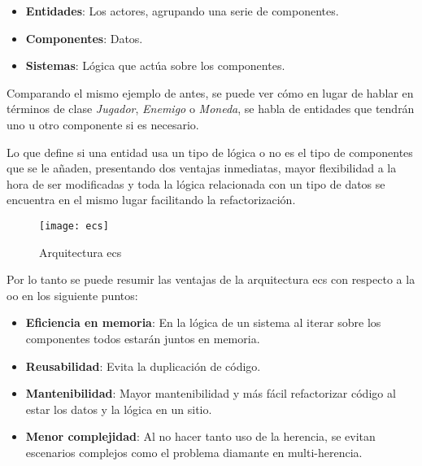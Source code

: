 \begin{itemize} 
	\item \textbf{Entidades}: Los actores, agrupando una serie de componentes. 
	\item \textbf{Componentes}: Datos.
	\item \textbf{Sistemas}: Lógica que actúa sobre los componentes.
\end{itemize}
Comparando el mismo ejemplo de antes, se puede ver cómo en lugar de hablar en términos de clase \textit{Jugador}, 
\textit{Enemigo} o \textit{Moneda}, se habla de entidades que tendrán uno u otro componente si es necesario.

Lo que define si una entidad usa un tipo de lógica o no es el tipo de componentes que se le añaden, presentando dos
ventajas inmediatas, mayor flexibilidad a la hora de ser modificadas y toda la lógica relacionada con un tipo de datos
se encuentra en el mismo lugar facilitando la refactorización.

\begin{figure}[!h]
	\centering
	\texttt{[image: ecs]}
	\caption{Arquitectura \gls{ecs}}
	\label{ecs-figure}
\end{figure}

\newpage

Por lo tanto se puede resumir las ventajas de la arquitectura \gls{ecs} con respecto a la \gls{oo} en los siguiente puntos:

\begin{itemize} 
	\item \textbf{Eficiencia en memoria}: En la lógica de un sistema al iterar sobre los componentes todos estarán juntos en memoria\cite{memory-friendly}.
	\item \textbf{Reusabilidad}: Evita la duplicación de código.
	\item \textbf{Mantenibilidad}: Mayor mantenibilidad y más fácil refactorizar código al estar los datos y la lógica en un sitio.
	\item \textbf{Menor complejidad}: Al no hacer tanto uso de la herencia, se evitan escenarios complejos como el problema
	 diamante en multi-herencia.
\end{itemize}